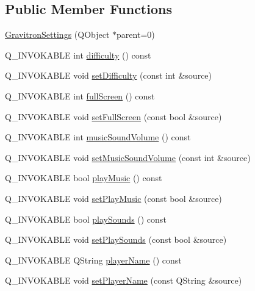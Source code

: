 \subsection*{Public Member Functions}
\begin{DoxyCompactItemize}
\item 
\hyperlink{class_gravitron_settings_a6cb102251aabe6808b03882e891b7bbf}{Gravitron\+Settings} (Q\+Object $\ast$parent=0)
\item 
Q\+\_\+\+I\+N\+V\+O\+K\+A\+B\+L\+E int \hyperlink{class_gravitron_settings_afe99529e5133887abc2ec6cdf05ae319}{difficulty} () const 
\item 
Q\+\_\+\+I\+N\+V\+O\+K\+A\+B\+L\+E void \hyperlink{class_gravitron_settings_ae8240cfb314457bd03e7053c0fe69aa3}{set\+Difficulty} (const int \&source)
\item 
Q\+\_\+\+I\+N\+V\+O\+K\+A\+B\+L\+E int \hyperlink{class_gravitron_settings_afa85ead0e4713679fa5b7e33aa7a5eee}{full\+Screen} () const 
\item 
Q\+\_\+\+I\+N\+V\+O\+K\+A\+B\+L\+E void \hyperlink{class_gravitron_settings_a63094c938fb60cc79ca096dd2444745a}{set\+Full\+Screen} (const bool \&source)
\item 
Q\+\_\+\+I\+N\+V\+O\+K\+A\+B\+L\+E int \hyperlink{class_gravitron_settings_ace2f3ca4ca6680832e14b546097a7f59}{music\+Sound\+Volume} () const 
\item 
Q\+\_\+\+I\+N\+V\+O\+K\+A\+B\+L\+E void \hyperlink{class_gravitron_settings_a19127cb8ad9035391cef6607ebfcfbd8}{set\+Music\+Sound\+Volume} (const int \&source)
\item 
Q\+\_\+\+I\+N\+V\+O\+K\+A\+B\+L\+E bool \hyperlink{class_gravitron_settings_a609265806b2879e7210f2d3a12b88f45}{play\+Music} () const 
\item 
Q\+\_\+\+I\+N\+V\+O\+K\+A\+B\+L\+E void \hyperlink{class_gravitron_settings_afcaa509baf03618793cc7fcfb5ef2030}{set\+Play\+Music} (const bool \&source)
\item 
Q\+\_\+\+I\+N\+V\+O\+K\+A\+B\+L\+E bool \hyperlink{class_gravitron_settings_aa412b289968c89d9e6e2ebd8932260bf}{play\+Sounds} () const 
\item 
Q\+\_\+\+I\+N\+V\+O\+K\+A\+B\+L\+E void \hyperlink{class_gravitron_settings_a658374f96e4bb64f91e770a6df87cc69}{set\+Play\+Sounds} (const bool \&source)
\item 
Q\+\_\+\+I\+N\+V\+O\+K\+A\+B\+L\+E Q\+String \hyperlink{class_gravitron_settings_a8e707f83dc20e85cd0632a858787cf7d}{player\+Name} () const 
\item 
Q\+\_\+\+I\+N\+V\+O\+K\+A\+B\+L\+E void \hyperlink{class_gravitron_settings_ac6dc8d0025905248e80217198513a044}{set\+Player\+Name} (const Q\+String \&source)

\end{DoxyCompactItemize}
